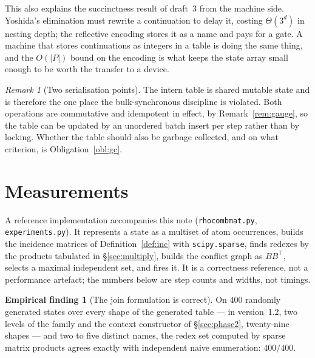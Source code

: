 \documentclass[11pt,a4paper]{article}
\theoremstyle{plain}
\theoremstyle{definition}
\newtheorem{finding}[theorem]{Empirical finding}
\theoremstyle{remark}
\newtheorem{remark}[theorem]{Remark}
\begin{document}
This also explains the succinctness result of draft~3 from the machine side.
Yoshida's elimination must rewrite a continuation to delay it, costing
$\Theta(3^{d})$ in nesting depth; the reflective encoding stores it as a name
and pays for a gate. A machine that stores continuations as integers in a
table is doing the same thing, and the $O(|P|)$ bound on the encoding is what
keeps the state array small enough to be worth the transfer to a device.

\begin{remark}[Two serialisation points]
The intern table is shared mutable state and is therefore the one place the
bulk-synchronous discipline is violated. Both operations are commutative and
idempotent in effect, by Remark~\ref{rem:gauge}, so the table can be updated by
an unordered batch insert per step rather than by locking. Whether the table
should also be garbage collected, and on what criterion, is
Obligation~\ref{obl:gc}.
\end{remark}

\section{Measurements}
\label{sec:measure}

A reference implementation accompanies this note
(\texttt{rhocombmat.py}, \texttt{experiments.py}). It represents a state as a
multiset of atom occurrences, builds the incidence matrices of
Definition~\ref{def:inc} with \texttt{scipy.sparse}, finds redexes by the
products tabulated in \S\ref{sec:multiply}, builds the conflict graph as
$BB^{\top}$, selects a maximal independent set, and fires it. It is a
correctness reference, not a performance artefact; the numbers below are step
counts and widths, not timings.

\begin{finding}[The join formulation is correct]
\label{find:valid}
On 400 randomly generated states over every shape of the generated table ---
in version~1.2, two levels of the family and the context constructor of
\S\ref{sec:phase2}, twenty-nine shapes --- and two to
five distinct names, the redex set computed by sparse matrix products agrees
exactly with independent naive enumeration: $400/400$.
\end{finding}
\end{document}
